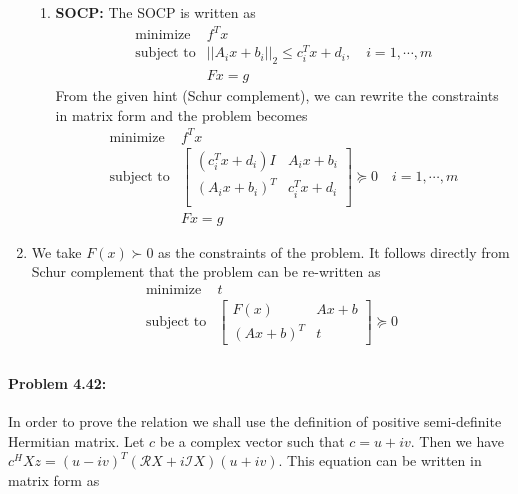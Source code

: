 \documentclass[12pt] {article}
\begin{document}
\begin{enumerate}
\begin{enumerate}
\item \textbf{SOCP:}
The SOCP is written as 
\[
\begin{array}{cl}
\text{minimize} & f^{T}x\\
\text{subject to} & ||A_{i}x +b_{i} ||_{2} \leq c_{i}^{T}x+d_{i}, \quad i=1,\cdots,m\\
&Fx = g
\end{array} 
\]
From the given hint (Schur complement), we can rewrite the constraints in matrix form and the problem becomes 
\[
\begin{array}{cl}
\text{minimize} & f^{T}x\\
\text{subject to} & \left[ \begin{array}{cc}
                     (c_{i}^{T}x+d_{i})I & A_{i}x+b_{i} \\
                     (A_{i}x+b_{i})^{T} & c_{i}^{T}x+d_{i} \\
                     \end{array} \right] \succeq 0 \quad i=1,\cdots,m\\
&Fx = g
\end{array} 
\]
\end{enumerate}
\item We take $F(x) \succ 0 $ as the constraints of the problem. It follows directly from Schur complement that the problem can be re-written as 
\[
\begin{array}{cl}
\text{minimize} & t\\
\text{subject to} & \left[ \begin{array}{cc}
					F(x)       & Ax+b\\
					(Ax+b)^{T} & t
                     \end{array} \right] \succeq 0 \\
\end{array} 
\]




\end{enumerate}
\paragraph{Problem 4.42:} 
In order to prove the relation we shall use the definition of positive semi-definite Hermitian matrix. Let $c$ be a complex vector such that $c= u+iv$. Then we have $c^{H}Xz = (u-iv)^{T}(\mathscr{R}X + i\mathscr{I}X)(u+iv)$. This equation can be written in matrix form as 
\end{document}
